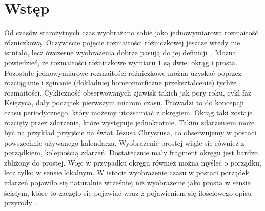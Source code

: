 \newpage
\section{Wstęp}
Od czasów starożytnych czas wyobrażano sobie jako jednowymiarowa 
rozmaitość różniczkową. 
Oczywiście pojęcie rozmaitości różniczkowej jeszcze wtedy nie istniało, 
lecz ówczesne wyobrażenia dobrze pasują do jej 
definicji~\cite{heller1993fizyka}. 
Można powiedzieć, że rozmaitości różniczkowe 
 wymiaru $1$ są dwie: okrąg i prosta. 
Pozostałe jednowymiarowe rozmaitości różniczkowe można uzyskać 
poprzez rozciąganie i zginanie (dokładniej homeomorficzne przekształcenie) 
tychże rozmaitości.
Cykliczność obserwowanych zjawisk takich jak pory roku, cykl faz 
Księżyca, dały początek pierwszym miarom czasu. 
Prowadzi to do koncepcji czasu periodycznego, który możemy 
utożsamiać z okręgiem. 
Okrąg taki zostaje rozcięty przez zdarzenie, które występuje 
jednokrotnie. Takim zdarzeniem może być na przykład 
przyjście na świat Jezusa Chrystusa, co 
obserwujemy w postaci powszechnie 
używanego kalendarza. 
Wyobrażenie prostej wiąże się również z porządkiem, 
kolejnością zdarzeń. 
Dostatecznie mały fragment okręgu jest bardzo zbliżony do
prostej. Więc w przypadku okręgu również można myśleć o
 porządku, lecz tylko w sensie lokalnym. 
W istocie wyobrażenie czasu w postaci porządek zdarzeń
pojawiło się naturalnie wcześniej niż wyobrażenie jako prosta 
w sensie ścisłym, które to zaczęło się pojawiać wraz 
z pojawieniem się ilościowego opisu przyrody~\cite{czasHeller}.


